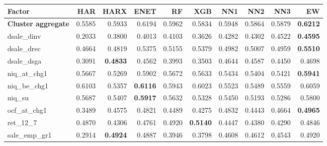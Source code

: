\begin{longtable}{>{\raggedright\arraybackslash}p{2.6cm}rrrrrrrrr}
\hline
Factor & HAR & HARX & ENET & RF & XGB & NN1 & NN2 & NN3 & EW \\
\hline
\textbf{Cluster aggregate} & 0.5585 & \cellcolor{blue!10}0.5933 & \cellcolor{blue!10}0.6194 & \cellcolor{blue!10}0.5962 & \cellcolor{blue!10}0.5834 & \cellcolor{blue!10}0.5948 & \cellcolor{blue!10}0.5864 & \cellcolor{blue!10}0.5879 & \textbf{\cellcolor{blue!10}0.6212} \\
dsale\_dinv & 0.2033 & \cellcolor{blue!10}0.3800 & \cellcolor{blue!10}0.4013 & \cellcolor{blue!10}0.4103 & \cellcolor{blue!10}0.3626 & \cellcolor{blue!10}0.4282 & \cellcolor{blue!10}0.4302 & \cellcolor{blue!10}0.4522 & \textbf{\cellcolor{blue!10}0.4595} \\
dsale\_drec & 0.4664 & \cellcolor{blue!10}0.4819 & \cellcolor{blue!10}0.5375 & \cellcolor{blue!10}0.5155 & \cellcolor{blue!10}0.5379 & \cellcolor{blue!10}0.4982 & \cellcolor{blue!10}0.5007 & \cellcolor{blue!10}0.4959 & \textbf{\cellcolor{blue!10}0.5510} \\
dsale\_dsga & 0.3091 & \textbf{\cellcolor{blue!10}0.4833} & \cellcolor{blue!10}0.4562 & \cellcolor{blue!10}0.3993 & \cellcolor{blue!10}0.3503 & \cellcolor{blue!10}0.4644 & \cellcolor{blue!10}0.4587 & \cellcolor{blue!10}0.4450 & \cellcolor{blue!10}0.4698 \\
niq\_at\_chg1 & 0.5667 & 0.5269 & \cellcolor{blue!10}0.5902 & \cellcolor{blue!10}0.5672 & 0.5633 & 0.5434 & 0.5404 & 0.5421 & \textbf{\cellcolor{blue!10}0.5941} \\
niq\_be\_chg1 & 0.6103 & 0.5357 & \textbf{\cellcolor{blue!10}0.6116} & 0.5943 & 0.6023 & 0.5523 & 0.5489 & 0.5559 & 0.6059 \\
niq\_su & 0.5687 & 0.5407 & \textbf{\cellcolor{blue!10}0.5917} & 0.5632 & 0.5328 & 0.5450 & 0.5193 & 0.5286 & \cellcolor{blue!10}0.5800 \\
ocf\_at\_chg1 & 0.3489 & \cellcolor{blue!10}0.4575 & \cellcolor{blue!10}0.4821 & \cellcolor{blue!10}0.4489 & \cellcolor{blue!10}0.4275 & \cellcolor{blue!10}0.4832 & \cellcolor{blue!10}0.4443 & \cellcolor{blue!10}0.4664 & \textbf{\cellcolor{blue!10}0.4965} \\
ret\_12\_7 & 0.4870 & 0.4306 & 0.4761 & \cellcolor{blue!10}0.4920 & \textbf{\cellcolor{blue!10}0.5140} & 0.4447 & 0.4380 & 0.4290 & 0.4846 \\
sale\_emp\_gr1 & 0.2914 & \textbf{\cellcolor{blue!10}0.4924} & \cellcolor{blue!10}0.4887 & \cellcolor{blue!10}0.3946 & \cellcolor{blue!10}0.3798 & \cellcolor{blue!10}0.4608 & \cellcolor{blue!10}0.4612 & \cellcolor{blue!10}0.4543 & \cellcolor{blue!10}0.4920 \\

\end{longtable}
